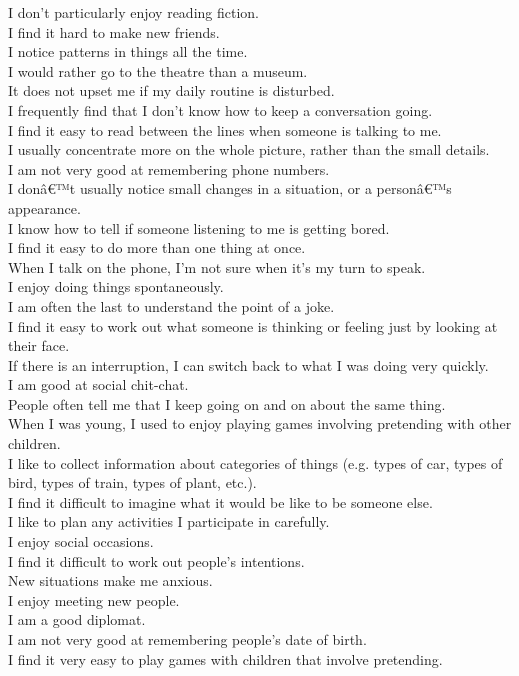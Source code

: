 \documentclass[a4paper, 11pt]{article}
\begin{document}
I don't particularly enjoy reading fiction.\\
I find it hard to make new friends.\\
I notice patterns in things all the time.\\
I would rather go to the theatre than a museum.\\
It does not upset me if my daily routine is disturbed.\\
I frequently find that I don't know how to keep a conversation going.\\
I find it easy to read between the lines when someone is talking to me.\\
I usually concentrate more on the whole picture, rather than the small details.\\
I am not very good at remembering phone numbers.\\
I donâ€™t usually notice small changes in a situation, or a personâ€™s appearance.\\
I know how to tell if someone listening to me is getting bored.\\
I find it easy to do more than one thing at once.\\
When I talk on the phone, I'm not sure when it's my turn to speak.\\
I enjoy doing things spontaneously.\\
I am often the last to understand the point of a joke.\\
I find it easy to work out what someone is thinking or feeling just by looking at their face.\\
If there is an interruption, I can switch back to what I was doing very quickly. \\
I am good at social chit-chat.\\
People often tell me that I keep going on and on about the same thing.\\
When I was young, I used to enjoy playing games involving pretending with other children.\\
I like to collect information about categories of things (e.g. types of car, types of bird, types of train, types of plant, etc.).\\
I find it difficult to imagine what it would be like to be someone else.\\
I like to plan any activities I participate in carefully.\\
I enjoy social occasions.\\
I find it difficult to work out people's intentions.\\
New situations make me anxious.\\
I enjoy meeting new people.\\
I am a good diplomat.\\
I am not very good at remembering people's date of birth.\\
I find it very easy to play games with children that involve pretending.\\
\end{document}
